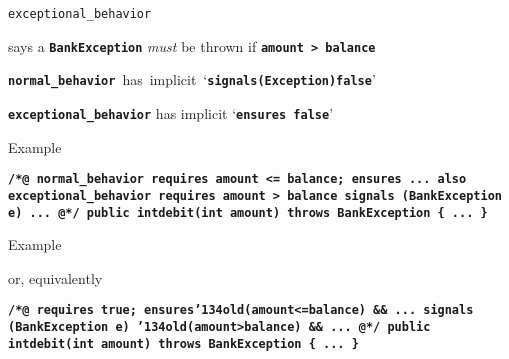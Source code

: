 \documentclass[
pdf,
nocolorBG,
slideColor,
erik,
]{prosper}
\newcommand{\code}[1]{{\rm \texttt{\textbf{\small #1}}}}
\newcommand{\old}     {\(\backslash\)old}
\newcommand{\bsl}{\char'134}
\renewcommand{\old}{\bsl old}
\begin{document}
\begin{slide}{\texttt{exceptional\_behavior}}
\vspace*{-3ex}



says a \code{BankException} \textit{must} be thrown if \code{amount > balance}

\bigskip

\mbox{\code{{\green normal\_behavior}} has implicit
`\code{{\green signals(Exception)false}}}'

\smallskip
\code{\blue exceptional\_behavior} has implicit
`\code{{\blue ensures false}}'


\end{slide}



\begin{slide}{Example}
\vspace*{-3ex}

\begin{alltt}\code{\scriptsize{\green /*@} normal_behavior
        requires amount <= balance;
        ensures  ...
    also
      exceptional_behavior
        requires amount > balance
        signals (BankException e) ...
{\green   @*/}
  public int{\green debit}(int amount) throws BankException 
  \{ ...  \}
}
\end{alltt}

\end{slide}

\begin{slide}{Example}
\vspace*{-3ex}

or, equivalently

\begin{alltt}\code{\scriptsize{\green /*@} requires true;
     ensures{\red \old(amount<=balance)} && ...
     signals (BankException e)  
            {\red \old(amount>balance)} && ...
{\green   @*/}
  public int{\green debit}(int amount) throws BankException 
  \{ ...  \}
}
\end{alltt}


\end{slide}
\end{document}
